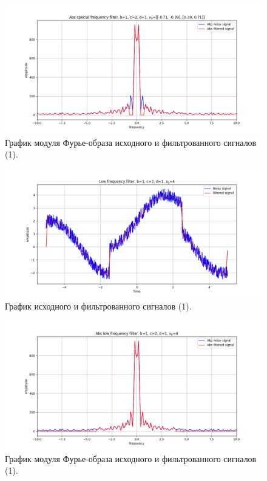 \documentclass[a4paper, 12pt]{article}
\begin{document}
    \begin{figure}[!htb]
        \centering
        \includegraphics[scale=0.48]{1_abs_u_U_nospec.png}
        \captionsetup{skip=0pt}
        \caption{График модуля Фурье-образа исходного и фильтрованного сигналов (1).}
        \label{fig:fig72}
    \end{figure}
    \begin{figure}[!htb]
        \centering
        \includegraphics[scale=0.48]{1_1_u_flt_u_nospec.png}
        \captionsetup{skip=0pt}
        \caption{График исходного и фильтрованного сигналов (1).}
        \label{fig:fig73}
    \end{figure}
    \begin{figure}[!htb]
        \centering
        \includegraphics[scale=0.48]{1_1_abs_u_U_nospec.png}
        \captionsetup{skip=0pt}
        \caption{График модуля Фурье-образа исходного и фильтрованного сигналов (1).}
        \label{fig:fig74}
    \end{figure}
\end{document}
